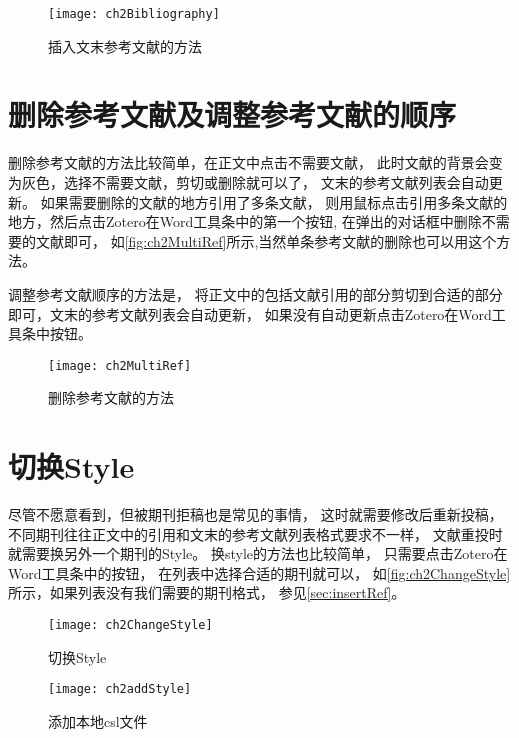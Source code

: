 \documentclass[cn,11pt,chinese]{elegantbook}
\begin{document}
\begin{enumerate}
			\begin{figure}[htbp]
				\centering
				\texttt{[image: ch2Bibliography]}
				\caption{插入文末参考文献的方法}
				\label{fig:ch2Bibliography}
			\end{figure}
		\end{enumerate}
		\section{删除参考文献及调整参考文献的顺序}
		删除参考文献的方法比较简单，在正文中点击不需要文献，
		此时文献的背景会变为灰色，选择不需要文献，剪切或删除就可以了，
		文末的参考文献列表会自动更新。
		如果需要删除的文献的地方引用了多条文献，
		则用鼠标点击引用多条文献的地方，然后点击Zotero在Word工具条中的第一个按钮,
		在弹出的对话框中删除不需要的文献即可，
		如\autoref{fig:ch2MultiRef}所示,当然单条参考文献的删除也可以用这个方法。
		
		调整参考文献顺序的方法是，
		将正文中的包括文献引用的部分剪切到合适的部分即可，文末的参考文献列表会自动更新，
		如果没有自动更新点击Zotero在Word工具条中按钮。
		
		\begin{figure}[htbp]
			\centering
			\texttt{[image: ch2MultiRef]}
			\caption{删除参考文献的方法}
			\label{fig:ch2MultiRef}
		\end{figure}
		\section{切换Style}\label{sec:changeStyle}
			尽管不愿意看到，但被期刊拒稿也是常见的事情，
			这时就需要修改后重新投稿，不同期刊往往正文中的引用和文末的参考文献列表格式要求不一样，
			文献重投时就需要换另外一个期刊的Style。
			换style的方法也比较简单，
			只需要点击Zotero在Word工具条中的按钮，
			在列表中选择合适的期刊就可以，
			如\autoref{fig:ch2ChangeStyle}所示，如果列表没有我们需要的期刊格式，
			参见\cref{sec:insertRef}。
				\begin{figure}
					\centering
					\texttt{[image: ch2ChangeStyle]}
					\caption{切换Style}
					\label{fig:ch2ChangeStyle}
				\end{figure}
				\begin{figure}[htbp]
					\centering
					\texttt{[image: ch2addStyle]}
					\caption{添加本地csl文件}
					\label{fig:ch2addStyle}
				\end{figure}
\end{document}
